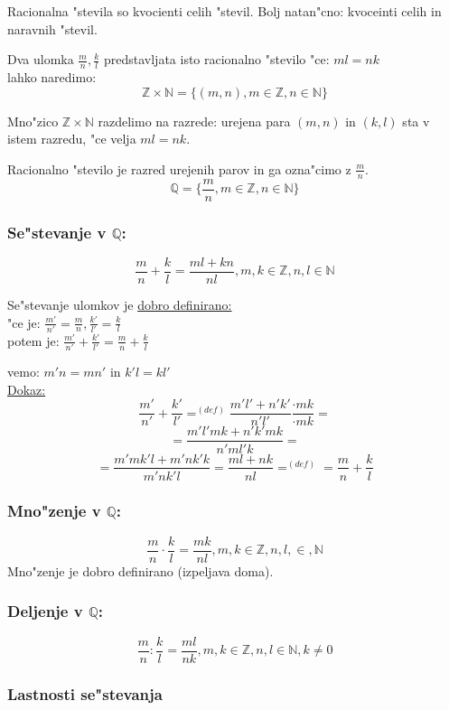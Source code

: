 Racionalna "stevila so kvocienti celih "stevil. Bolj natan"cno: kvoceinti celih in naravnih "stevil.

Dva ulomka \(\frac{m}{n}, \frac{k}{l} \) predstavljata isto racionalno "stevilo "ce: \(ml = nk \)\\
lahko naredimo:
\[\mathbb{Z} \times \mathbb{N} = \{(m, n), m \in \mathbb{Z}, n \in \mathbb{N} \}\]

Mno"zico \(\mathbb{Z} \times \mathbb{N} \) razdelimo na razrede: urejena para \((m, n)\) in \((k, l)\) sta v istem razredu, "ce velja \(ml = nk\).

Racionalno "stevilo je razred urejenih parov in ga ozna"cimo z \(\frac{m}{n}\).
\[\mathbb{Q} = \{\frac{m}{n}, m \in \mathbb{Z}, n \in \mathbb{N}\} \]

\subsubsection*{Se"stevanje v \(\mathbb{Q}\):}
\[\frac{m}{n} + \frac{k}{l} = \frac{ml + kn}{nl}, m, k \in \mathbb{Z}, n, l \in \mathbb{N} \]

Se"stevanje ulomkov je \underline{dobro definirano:}\\
"ce je: \(\frac{m'}{n'} = \frac{m}{n}, \frac{k'}{l'} = \frac{k}{l}\)\\
potem je: \(\frac{m'}{n'} + \frac{k'}{l'} = \frac{m}{n} + \frac{k}{l}\)

vemo: \(m'n = mn'\) in \(k'l = kl'\)\\
\underline{Dokaz:}
\[\frac{m'}{n'} + \frac{k'}{l'} =^{(def)} \frac{m'l' + n'k'}{n'l'} \frac{\cdot mk}{\cdot mk}=\]
\[= \frac{m'l'mk + n'k'mk}{n'ml'k} = \]
\[= \frac{m'mk'l + m'nk'k}{m'nk'l} = \frac{ml + nk}{nl} =^{(def)} = \frac{m}{n} + \frac{k}{l}\]

\subsubsection*{Mno"zenje v \(\mathbb{Q}\):}
\[\frac{m}{n} \cdot \frac{k}{l} = \frac{mk}{nl}, m, k \in \mathbb{Z}, n, l, \in, \mathbb{N}\]
Mno"zenje je dobro definirano (izpeljava doma).

\subsubsection*{Deljenje v \(\mathbb{Q}\):}
\[\frac{m}{n} : \frac{k}{l} = \frac{ml}{nk}, m, k \in \mathbb{Z}, n, l \in \mathbb{N}, k \neq 0 \]

\subsubsection*{Lastnosti se"stevanja}

